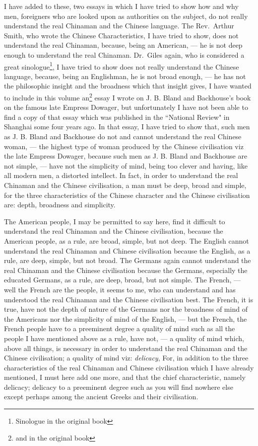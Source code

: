 I have added to these, two essays in which I have tried to show how and why men, foreigners who are looked upon as authorities on the subject, do not really understand the real Chinaman and the Chinese language.
The Rev.~Arthur Smith, who wrote the Chinese Characteristics, I have tried to show, does not understand the real Chinaman, because, being an American, --- he is not deep enough to understand the real Chinaman.
Dr.~Giles again, who is considered a great sinologue\footnote{Sinologue in the original book}, I have tried to show does not really understand the Chinese language, because, being an Englishman, he is not broad enough, --- he has not the philosophic insight and the broadness which that insight gives, I have wanted to include in this volume an\footnote{and in the original book} essay I wrote on J. B. Bland and Backhouse's book on the famous late Empress Dowager, but unfortunately I have not been able to find a copy of that essay which was published in the ``National Review" in Shanghai some four years ago.
In that essay, I have tried to show that, such men as J. B. Bland and Backhouse do not and cannot understand the real Chinese woman, --- the highest type of woman produced by the Chinese civilisation viz the late Empress Dowager, because such men as J. B. Bland and Backhouse are not simple, --- have not the simplicity of mind, being too clever and having, like all modern men, a distorted intellect\cite{num1}. 
In fact, in order to understand the real Chinaman and the Chinese civilisation, a man must be deep, broad and simple, for the three characteristics of the Chinese character and the Chinese civilisation are: depth, broadness and simplicity.

The American people, I may be permitted to say here, find it difficult to understand the real Chinaman and the Chinese civilisation, because the American people, as a rule, are broad, simple, but not deep.
The English cannot understand the real Chinaman and Chinese civilisation because the English, as a rule, are deep, simple, but not broad.
The Germans again cannot understand the real Chinaman and the Chinese civilisation because the Germans, especially the educated Germans, as a rule, are deep, broad, but not simple.
The French, --- well the French are the people, it seems to me, who can understand and has understood the real Chinaman and the Chinese civilisation best\cite{num2}. 
The French, it is true, have not the depth of nature of the Germans nor the broadness of mind of the Americans nor the simplicity of mind of the English, --- but the French, the French people have to a preeminent degree a quality of mind such as all the people I have mentioned above as a rule, have not, --- a quality of mind which, above all things, is necessary in order to understand the real Chinaman and the Chinese civilisation; a quality of mind viz: \emph{delicacy}, For, in addition to the three characteristics of the real Chinaman and Chinese civilisation which I have already mentioned, I must here add one more, and that the chief characteristic, namely delicacy; delicacy to a preeminent  degree such as you will find nowhere else except perhaps among the ancient Greeks and their civilisation.

